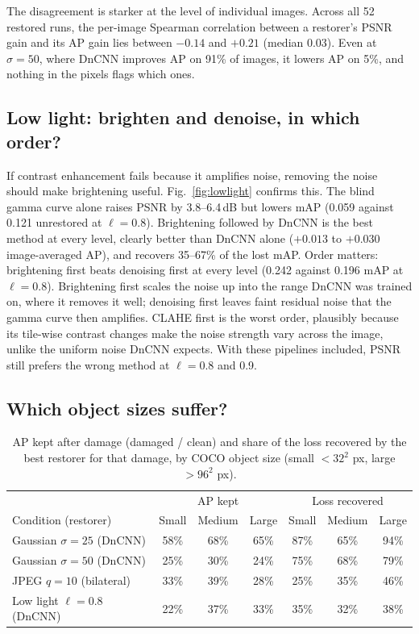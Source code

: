\documentclass[11pt]{article}
\newcommand{\figref}[1]{Fig.~\ref{#1}}
\begin{document}
The disagreement is starker at the level of individual images. Across all 52 restored runs, the per-image Spearman correlation between a restorer's PSNR gain and its AP gain lies between $-0.14$ and $+0.21$ (median 0.03). Even at $\sigma = 50$, where DnCNN improves AP on 91\% of images, it lowers AP on 5\%, and nothing in the pixels flags which ones.

\subsection{Low light: brighten and denoise, in which order?}
\label{sec:lowlight}
If contrast enhancement fails because it amplifies noise, removing the noise should make brightening useful. \figref{fig:lowlight} confirms this. The blind gamma curve alone raises PSNR by 3.8--6.4\,dB but lowers mAP (0.059 against 0.121 unrestored at $\ell = 0.8$). Brightening followed by DnCNN is the best method at every level, clearly better than DnCNN alone ($+0.013$ to $+0.030$ image-averaged AP), and recovers 35--67\% of the lost mAP. Order matters: brightening first beats denoising first at every level (0.242 against 0.196 mAP at $\ell=0.8$). Brightening first scales the noise up into the range DnCNN was trained on, where it removes it well; denoising first leaves faint residual noise that the gamma curve then amplifies. CLAHE first is the worst order, plausibly because its tile-wise contrast changes make the noise strength vary across the image, unlike the uniform noise DnCNN expects. With these pipelines included, PSNR still prefers the wrong method at $\ell=0.8$ and 0.9.

\subsection{Which object sizes suffer?}
\label{sec:sizes}

\begin{table}[t]
\centering\small
\caption{AP kept after damage (damaged / clean) and share of the loss recovered by the best restorer for that damage, by COCO object size (small $<32^2$ px, large $>96^2$ px).}
\label{tab:sizes}
\begin{tabular}{@{}lccc|ccc@{}}
\toprule
 & \multicolumn{3}{c|}{AP kept} & \multicolumn{3}{c}{Loss recovered} \\
Condition (restorer) & Small & Medium & Large & Small & Medium & Large \\
\midrule
Gaussian $\sigma=25$ (DnCNN) & 58\% & 68\% & 65\% & 87\% & 65\% & 94\% \\
Gaussian $\sigma=50$ (DnCNN) & 25\% & 30\% & 24\% & 75\% & 68\% & 79\% \\
JPEG $q=10$ (bilateral) & 33\% & 39\% & 28\% & 25\% & 35\% & 46\% \\
Low light $\ell=0.8$ (DnCNN) & 22\% & 37\% & 33\% & 35\% & 32\% & 38\% \\
\bottomrule
\end{tabular}
\end{table}
\end{document}
